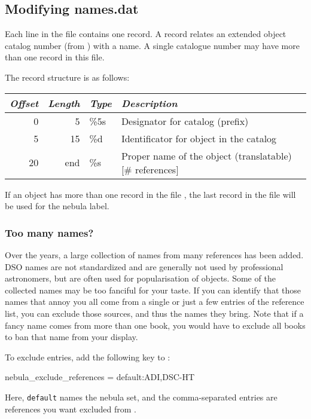 \subsection{Modifying names.dat}%
\label{sec:dso:modifyingNamesDat}

Each line in the file   contains one record. A record
relates an extended object catalog number (from )
with a name. A single catalogue number may have more than one record in
this file.

The record structure is as follows:

\noindent%
\begin{tabularx}{\textwidth}{r|r|l|X}
\toprule
\emph{Offset} & \emph{Length} & \emph{Type} & \emph{Description}\\
\midrule
0  &  5 & \%5s & Designator for catalog (prefix)\\
5  & 15 & \%d  & Identificator for object in the catalog\\
20 & end & \%s  & Proper name of the object (translatable) [\# references]\\
\bottomrule
\end{tabularx}

\noindent If an object has more than one record in the file ,
the last record in the file will be used for the nebula label.

\subsubsection{Too many names?}
Over the years, a large collection of names from many references has been added. 
DSO names are not standardized and are generally not used by professional astronomers, but are often used for popularisation of objects. 
Some of the collected names may be too fanciful for your taste. 
If you can identify that those names that annoy you all come from a single or just a few entries of the reference list, 
you can exclude those sources, and thus the names they bring. Note that if a fancy name comes from more than one book, 
you would have to exclude all books to ban that name from your display.

To exclude entries, add the following key to :
\begin{configfile}
[astro]
nebula_exclude_references = default:ADI,DSC-HT
\end{configfile}
%
Here, \texttt{default} names the nebula set, and the comma-separated entries are references you want excluded from .

